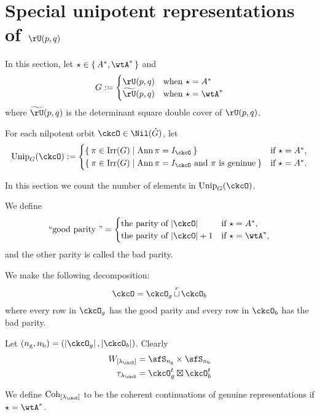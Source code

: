 \documentclass[12pt,a4paper]{amsart}
\def\abs#1{\left|{#1}\right|}
\DeclareMathOperator{\Ann}{Ann}
\numberwithin{equation}{section}
\theoremstyle{remark}
\def\Irr{\mathrm{Irr}}
\def\Unip{\mathrm{Unip}}
\def\ckG{\check{G}}
\def\lamck{\lambda_\ckcO}
\def\Lamck{[\lambda_\ckcO]}
\def\WLamck{W_{[\lambda_{\ckcO}]}}
\def\nbb{n_{\mathrm b}}
\def\ngg{n_{\mathrm g}}
\def\tU{\widetilde{\rU}}
\def\Coh{\mathrm{Coh}}
\def\cuprow{{\stackrel{r}{\sqcup}}}
\def\cuprow{{\,\stackrel{r}{\sqcup}\,}}
\begin{document}
\section{Special unipotent representations of $\rU(p,q)$}

In this section, let $\star \in \set{A^{*}, \wtA^{*}}$ and
\[
  G :=
  \begin{cases}
    \rU(p,q)  & \text{when }\star = A^{*}\\
    \tU(p,q)  & \text{when }\star = \wtA^{*}
\end{cases}
\]
where $\tU(p,q)$ is the determinant square double cover of $\rU(p,q)$.

For each nilpotent orbit $\ckcO\in \Nil(\ckG)$, let
\[
  \Unip_{G}(\ckcO) :=
  \begin{cases}
   \Set{\pi\in \Irr(G)| \Ann\pi = I_{\ckcO}} & \text{if $\star = A^{*}$}, \\
   \Set{\pi\in \Irr(G)| \Ann\pi = I_{\ckcO} \text{ and $\pi$ is
       geninue}} & \text{if $\star = A^{*}$}. \\
  \end{cases}
\]

In this section we count the number of elements in $\Unip_{G}(\ckcO)$.

We define
\[
  \text{``good parity ''} = \begin{cases}
    \text{the parity of $\abs{\ckcO}$} &  \text{if $\star = A^{*}$}, \\
    \text{the parity of $\abs{\ckcO}+1$} &  \text{if $\star = \wtA^{*}$}, \\
  \end{cases}
\]
and the other parity is called the bad parity.

We make the following decomposition:
\[
\ckcO = \ckcO_{g}\cuprow \ckcO_{b}
\]
where every row in $\ckcO_{g}$ has the good parity
and every row in $\ckcO_{b}$ has the bad parity.

Let $(\ngg,\nbb) = (\abs{\ckcO_g},\abs{\ckcO_b})$.
Clearly
\[
  \begin{split}
    \WLamck &= \sfS_{\ngg}\times \sfS_{\nbb}\\
    \tau_{\lamck}  & = \ckcO_{g}^{t}\boxtimes \ckcO_{b}^{t}\\
  \end{split}
\]

We define $\Coh_{\Lamck}$ to be the coherent continuations of genuine
representations if $\star = \wtA^{*}$.
\end{document}
